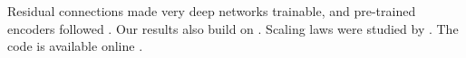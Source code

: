 \documentclass{article}
\begin{document}


Residual connections \citep[Sec.~3]{he2016deep} made very deep networks trainable,
and pre-trained encoders followed \citep{devlin2019bert}.
Our results also build on \citet{smith2023quantum}. %
Scaling laws were studied by \citet{kaplan2020scaling}.
The code is available online \citep{pytorch_site}.



\end{document}
